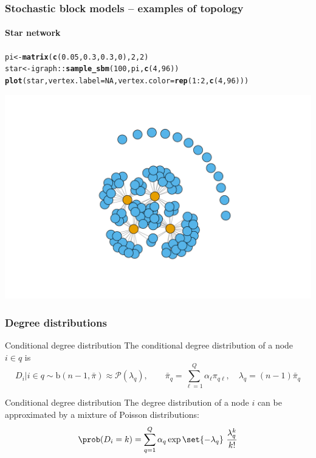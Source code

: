 \documentclass{beamer}\usepackage[]{graphicx}\usepackage[]{color}
\makeatletter
\newcommand{\hlnum}[1]{\textcolor[rgb]{0.686,0.059,0.569}{#1}}%
\newcommand{\hlopt}[1]{\textcolor[rgb]{0,0,0}{#1}}%
\newcommand{\hlstd}[1]{\textcolor[rgb]{0.345,0.345,0.345}{#1}}%
\newcommand{\hlkwb}[1]{\textcolor[rgb]{0.69,0.353,0.396}{#1}}%
\newcommand{\hlkwc}[1]{\textcolor[rgb]{0.333,0.667,0.333}{#1}}%
\newcommand{\hlkwd}[1]{\textcolor[rgb]{0.737,0.353,0.396}{\textbf{#1}}}%
\newenvironment{kframe}{%
 \def\at@end@of@kframe{}%
 \ifinner\ifhmode%
  \def\at@end@of@kframe{\end{minipage}}%
  \begin{minipage}{\columnwidth}%
 \fi\fi%
 \def\FrameCommand##1{\hskip\@totalleftmargin \hskip-\fboxsep
 \colorbox{shadecolor}{##1}\hskip-\fboxsep
     \hskip-\linewidth \hskip-\@totalleftmargin \hskip\columnwidth}%
 \MakeFramed {\advance\hsize-\width
   \@totalleftmargin\z@ \linewidth\hsize
   \@setminipage}}%
 {\par\unskip\endMakeFramed%
 \at@end@of@kframe}
\newenvironment{knitrout}{}{} %
\makeatother
\begin{document}
\begin{frame}[fragile]
  \frametitle{Stochastic block models -- examples of topology}
  \framesubtitle{Star network}

\begin{knitrout}\scriptsize
{}\color{fgcolor}\begin{kframe}
\begin{alltt}
\hlstd{pi} \hlkwb{<-} \hlkwd{matrix}\hlstd{(}\hlkwd{c}\hlstd{(}\hlnum{0.05}\hlstd{,}\hlnum{0.3}\hlstd{,}\hlnum{0.3}\hlstd{,}\hlnum{0}\hlstd{),}\hlnum{2}\hlstd{,}\hlnum{2}\hlstd{)}
\hlstd{star} \hlkwb{<-} \hlstd{igraph}\hlopt{::}\hlkwd{sample_sbm}\hlstd{(}\hlnum{100}\hlstd{, pi,} \hlkwd{c}\hlstd{(}\hlnum{4}\hlstd{,} \hlnum{96}\hlstd{))}
\hlkwd{plot}\hlstd{(star,} \hlkwc{vertex.label}\hlstd{=}\hlnum{NA}\hlstd{,} \hlkwc{vertex.color} \hlstd{=} \hlkwd{rep}\hlstd{(}\hlnum{1}\hlopt{:}\hlnum{2}\hlstd{,}\hlkwd{c}\hlstd{(}\hlnum{4}\hlstd{,}\hlnum{96}\hlstd{)))}
\end{alltt}
\end{kframe}
\includegraphics[width=.8\textwidth]{figures/unnamed-chunk-11-1} 
\end{knitrout}

\end{frame}

\begin{frame}
  \frametitle{Degree distributions}

  \begin{block}{Conditional degree distribution}
    The conditional degree distribution of a node $i\in q$ is
    \begin{equation*}
      D_i | i \in q \sim \mathrm{b}(n-1,\bar\pi) \approx \mathcal{P}(\lambda_q), \qquad \bar\pi_q = \sum_{\ell=1}^Q \alpha_\ell \pi_{q\ell}, \quad \lambda_q = (n-1)\bar\pi_q
    \end{equation*}
  \end{block}

  \vfill

  \begin{block}{Conditional degree distribution}
    The degree distribution of a node $i$ can be approximated by a mixture of Poisson distributions:
    \begin{equation*}
      \prob(D_i = k) = \sum_{q=1}^Q\alpha_q \exp{\set{-\lambda_q}} \ \frac{\lambda_q^k}{k !}
    \end{equation*}
  \end{block}

\end{frame}
\end{document}
